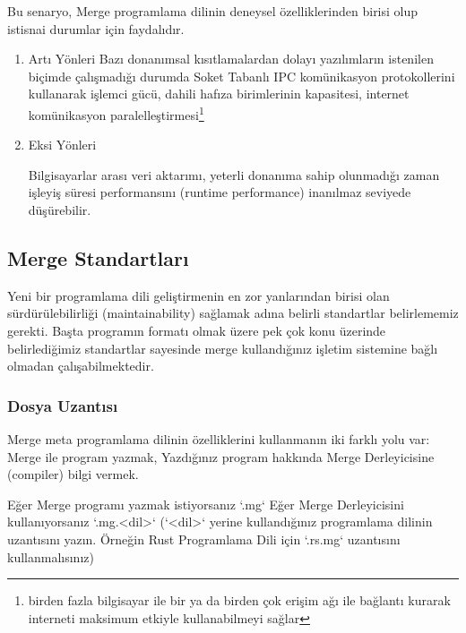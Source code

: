\documentclass[11pt]{article}
\begin{document}
Bu senaryo, Merge programlama dilinin deneysel özelliklerinden birisi olup istisnai durumlar için faydalıdır.
\begin{enumerate}
\item Artı Yönleri
\label{sec:orgc11e0a0}
Bazı donanımsal kısıtlamalardan dolayı yazılımların istenilen biçimde çalışmadığı durumda Soket Tabanlı IPC komünikasyon
protokollerini kullanarak işlemci gücü, dahili hafıza birimlerinin kapasitesi, internet komünikasyon
paralelleştirmesi\footnote{birden fazla bilgisayar ile bir ya da birden çok erişim ağı ile bağlantı kurarak interneti maksimum etkiyle kullanabilmeyi sağlar}
\item Eksi Yönleri
\label{sec:orgf6d2239}

Bilgisayarlar arası veri aktarımı, yeterli donanıma sahip olunmadığı zaman işleyiş süresi performansını (runtime performance) inanılmaz seviyede düşürebilir.
\end{enumerate}
\subsection{Merge Standartları}
\label{sec:org3f6abcf}

Yeni bir programlama dili geliştirmenin en zor yanlarından birisi olan sürdürülebilirliği (maintainability) sağlamak adına belirli standartlar belirlememiz gerekti. Başta programın formatı olmak üzere pek çok konu üzerinde belirlediğimiz standartlar sayesinde merge kullandığınız işletim sistemine bağlı olmadan çalışabilmektedir.
\subsubsection{Dosya Uzantısı}
\label{sec:org6d5886d}

Merge meta programlama dilinin özelliklerini kullanmanın iki farklı yolu var: Merge ile program yazmak, Yazdığınız program hakkında Merge Derleyicisine (compiler) bilgi vermek.

Eğer Merge programı yazmak istiyorsanız `.mg`
Eğer Merge Derleyicisini kullanıyorsanız `.mg.<dil>` (`<dil>` yerine kullandığınız programlama dilinin uzantısını yazın. Örneğin Rust Programlama Dili için `.rs.mg` uzantısını kullanmalısınız)
\end{document}
